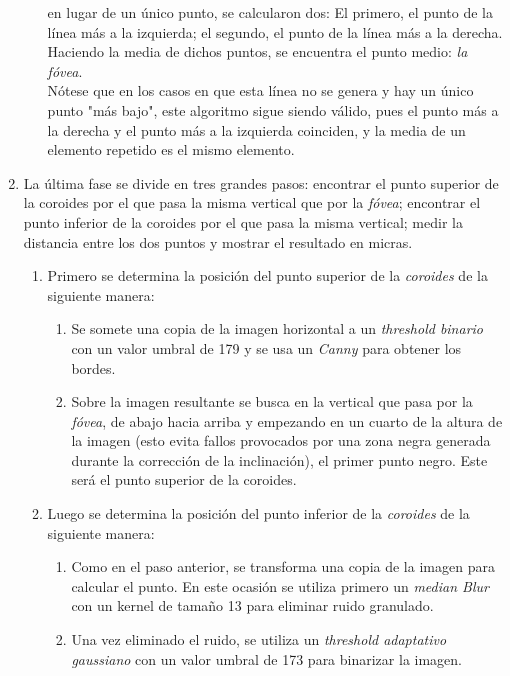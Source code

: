 \begin{enumerate}
\begin{enumerate}[label*=\arabic*.]
    en lugar de un único punto, se calcularon dos: El primero, el punto 
    de la línea más a la izquierda; el segundo, el punto de la línea más 
    a la derecha. Haciendo la media de dichos puntos, se encuentra el 
    punto medio: \emph{la fóvea}. \\
    Nótese que en los casos en que esta línea no se genera y hay un único 
    punto "más bajo", este algoritmo sigue siendo válido, pues el punto 
    más a la derecha y el punto más a la izquierda coinciden, y la media 
    de un elemento repetido es el mismo elemento.
  \end{enumerate}
\item La última fase se divide en tres grandes pasos: encontrar el
  punto superior de la coroides por el que pasa la misma vertical
  que por la \emph{fóvea}; encontrar el punto inferior de la coroides
  por el que pasa la misma vertical; medir la distancia entre los dos
  puntos y mostrar el resultado en micras.
  \begin{enumerate}[label*=\arabic*.]
  \item Primero se determina la posición del punto superior de la
    \emph{coroides} de la siguiente manera:
    \begin{enumerate}[label*=\arabic*.]
    \item Se somete una copia de la imagen horizontal a un 
      \emph{threshold binario} con un valor umbral de 179 y se usa un
      \emph{Canny} para obtener los bordes. 
    \item Sobre la imagen resultante se busca en la vertical que pasa 
      por la \emph{fóvea}, de abajo hacia arriba y empezando en un 
      cuarto de la altura de la imagen (esto evita fallos provocados 
      por una zona negra generada durante la corrección de la inclinación), 
      el primer punto negro. Este será el punto superior de la coroides.
    \end{enumerate}
  \item Luego se determina la posición del punto inferior de la
    \emph{coroides} de la siguiente manera:
    \begin{enumerate}[label*=\arabic*.]
    \item Como en el paso anterior, se transforma una copia de la imagen
      para calcular el punto. En este ocasión se utiliza primero un
      \emph{median Blur} con un kernel de tamaño 13 para eliminar ruido 
      granulado.
    \item Una vez eliminado el ruido, se utiliza un \emph{threshold adaptativo
    gaussiano} con un valor umbral de 173 para binarizar la imagen.

\end{enumerate}
\end{enumerate}
\end{enumerate}
